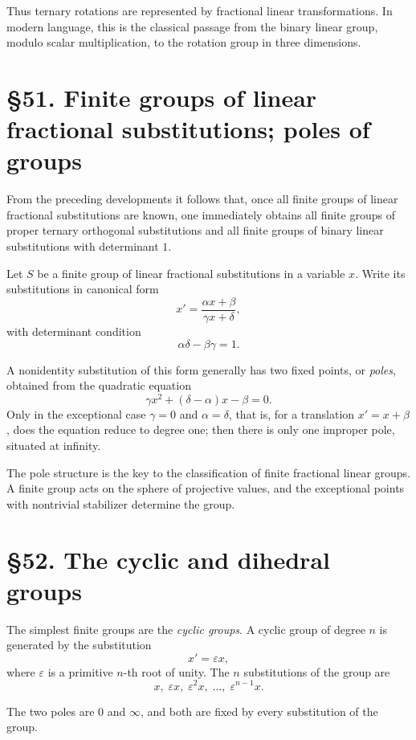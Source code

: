 \documentclass[11pt,a4paper]{book}
\newcommand{\webersection}[2]{\clearpage\section*{\S #1. #2}}
\begin{document}
Thus ternary rotations are represented by fractional linear transformations.  In modern language, this is the classical passage from the binary linear group, modulo scalar multiplication, to the rotation group in three dimensions.

\webersection{51}{Finite groups of linear fractional substitutions; poles of groups}

From the preceding developments it follows that, once all finite groups of linear fractional substitutions are known, one immediately obtains all finite groups of proper ternary orthogonal substitutions and all finite groups of binary linear substitutions with determinant \(1\).

Let \(S\) be a finite group of linear fractional substitutions in a variable \(x\).  Write its substitutions in canonical form
\begin{equation}
x'=\frac{\alpha x+\beta}{\gamma x+\delta},
\end{equation}
with determinant condition
\[
\alpha\delta-\beta\gamma=1.
\]

A nonidentity substitution of this form generally has two fixed points, or \emph{poles}, obtained from the quadratic equation
\begin{equation}
\gamma x^2+(\delta-\alpha)x-\beta=0.
\end{equation}
Only in the exceptional case \(\gamma=0\) and \(\alpha=\delta\), that is, for a translation \(x'=x+\beta\), does the equation reduce to degree one; then there is only one improper pole, situated at infinity.

The pole structure is the key to the classification of finite fractional linear groups.  A finite group acts on the sphere of projective values, and the exceptional points with nontrivial stabilizer determine the group.

\webersection{52}{The cyclic and dihedral groups}

The simplest finite groups are the \emph{cyclic groups}.  A cyclic group of degree \(n\) is generated by the substitution
\begin{equation}
x'=\varepsilon x,
\end{equation}
where \(\varepsilon\) is a primitive \(n\)-th root of unity.  The \(n\) substitutions of the group are
\begin{equation}
x,\;\varepsilon x,\;\varepsilon^2x,\;\ldots,\;\varepsilon^{n-1}x.
\end{equation}

The two poles are \(0\) and \(\infty\), and both are fixed by every substitution of the group.
\end{document}
